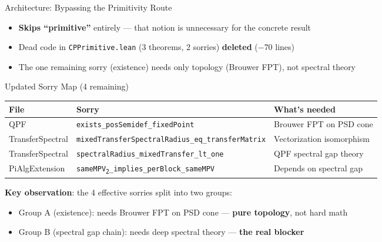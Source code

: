 \documentclass[aspectratio=169,10pt]{beamer}
\begin{document}
\begin{frame}{Architecture: Bypassing the Primitivity Route}
    \vspace{0.3em}
    \begin{itemize}\itemsep0.1em\small
        \item \textbf{Skips ``primitive''} entirely --- that notion is unnecessary for the concrete result
        \item Dead code in \texttt{CPPrimitive.lean} (3 theorems, 2 sorries) \textbf{deleted} ($-$70 lines)
        \item The one remaining sorry (existence) needs only topology (Brouwer FPT), not spectral theory
    \end{itemize}
\end{frame}

\begin{frame}{Updated Sorry Map (4 remaining)}
    \vspace{-0.5em}
    \begin{center}
        {\scriptsize
            \begin{tabular}{@{}lp{6.2cm}p{3.0cm}@{}}
                \toprule
                \textbf{File} & \textbf{Sorry} & \textbf{What's needed} \\
                \midrule
                QPF & \texttt{exists\_posSemidef\_fixedPoint} &
                    Brouwer FPT on PSD cone \\[2pt]
                TransferSpectral & \texttt{mixedTransferSpectralRadius\_eq\_transferMatrix} &
                    Vectorization isomorphism \\[2pt]
                TransferSpectral & \texttt{spectralRadius\_mixedTransfer\_lt\_one} &
                    QPF spectral gap theory \\[2pt]
                PiAlgExtension & \texttt{sameMPV\textsubscript{2}\_implies\_perBlock\_sameMPV} &
                    Depends on spectral gap \\
                \bottomrule
            \end{tabular}
        }
    \end{center}

    \vspace{0.3em}
    \textbf{Key observation}: the 4 effective sorries split into two groups:
    \begin{itemize}\itemsep0.1em\small
        \item \textcolor{amber}{Group A} (existence): needs Brouwer FPT on PSD cone --- \textbf{pure topology}, not hard math
        \item \textcolor{softred}{Group B} (spectral gap chain): needs deep spectral theory --- \textbf{the real blocker}
    \end{itemize}
\end{frame}
\end{document}
